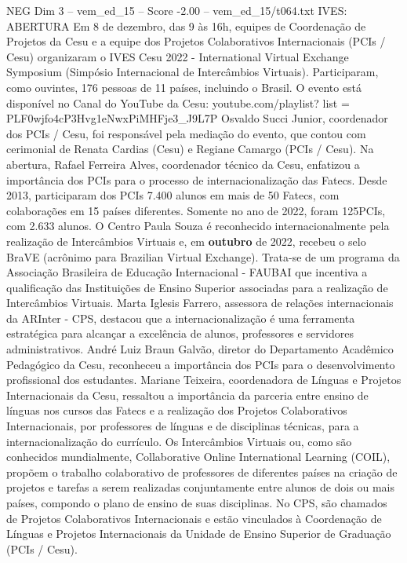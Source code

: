 \begin{textsample}{NEG Dim 3 – vem\_ed\_15 – Score -2.00 – vem\_ed\_15/t064.txt}  \label{ex:f3_neg_013}
IVES: ABERTURA Em 8 de dezembro, das 9 às 16h, equipes de Coordenação de Projetos da Cesu e a equipe dos Projetos Colaborativos Internacionais (PCIs / Cesu) organizaram o IVES Cesu 2022 - International Virtual Exchange Symposium (Simpósio Internacional de Intercâmbios Virtuais).
Participaram, como ouvintes, 176 pessoas de 11 países, incluindo o Brasil.
O evento está disponível no Canal do YouTube da Cesu: youtube.com/playlist? list = PLF0wjfo4cP3Hvg1eNwxPiMHFje3\_J9L7P Osvaldo Succi Junior, coordenador dos PCIs / Cesu, foi responsável pela mediação do evento, que contou com cerimonial de Renata Cardias (Cesu) e Regiane Camargo (PCIs / Cesu).
Na abertura, Rafael Ferreira Alves, coordenador técnico da Cesu, enfatizou a importância dos PCIs para o processo de internacionalização das Fatecs.
Desde 2013, participaram dos PCIs 7.400 alunos em mais de 50 Fatecs, com colaborações em 15 países diferentes.
Somente no ano de 2022, foram 125PCIs, com 2.633 alunos.
O Centro Paula Souza é reconhecido internacionalmente pela realização de Intercâmbios Virtuais e, em \textbf{outubro} de 2022, recebeu o selo BraVE (acrônimo para Brazilian Virtual Exchange).
Trata-se de um programa da Associação Brasileira de Educação Internacional - FAUBAI que incentiva a qualificação das Instituições de Ensino Superior associadas para a realização de Intercâmbios Virtuais.
Marta Iglesis Farrero, assessora de relações internacionais da ARInter - CPS, destacou que a internacionalização é uma ferramenta estratégica para alcançar a excelência de alunos, professores e servidores administrativos.
André Luiz Braun Galvão, diretor do Departamento Acadêmico Pedagógico da Cesu, reconheceu a importância dos PCIs para o desenvolvimento profissional dos estudantes.
Mariane Teixeira, coordenadora de Línguas e Projetos Internacionais da Cesu, ressaltou a importância da parceria entre ensino de línguas nos cursos das Fatecs e a realização dos Projetos Colaborativos Internacionais, por professores de línguas e de disciplinas técnicas, para a internacionalização do currículo.
Os Intercâmbios Virtuais ou, como são conhecidos mundialmente, Collaborative Online International Learning (COIL), propõem o trabalho colaborativo de professores de diferentes países na criação de projetos e tarefas a serem realizadas conjuntamente entre alunos de dois ou mais países, compondo o plano de ensino de suas disciplinas.
No CPS, são chamados de Projetos Colaborativos Internacionais e estão vinculados à Coordenação de Línguas e Projetos Internacionais da Unidade de Ensino Superior de Graduação (PCIs / Cesu).

\end{textsample}
